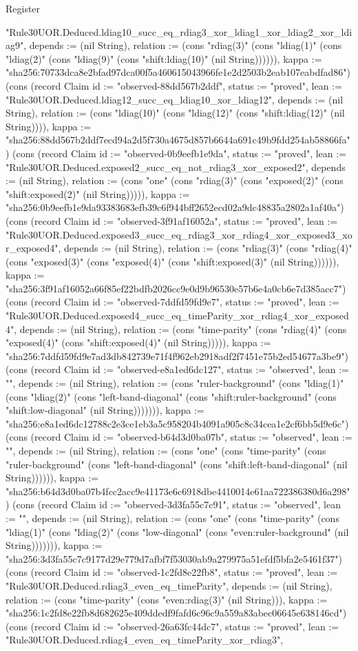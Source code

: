 \begin{lexlean}{Register}
\begin{semanticmodule}
{"Rule30UOR.Deduced.ldiag10_succ_eq_rdiag3_xor_ldiag1_xor_ldiag2_xor_ldiag9", depends := (nil String), relation := (cons "rdiag(3)" (cons "ldiag(1)" (cons "ldiag(2)" (cons "ldiag(9)" (cons "shift:ldiag(10)" (nil String)))))), kappa := "sha256:70733dca8e2bfad97dca00f5a460615043966fe1e2d2503b2eab107eabdfad86"}) (cons (record Claim {id := "observed-88dd567b2ddf", status := "proved", lean := "Rule30UOR.Deduced.ldiag12_succ_eq_ldiag10_xor_ldiag12", depends := (nil String), relation := (cons "ldiag(10)" (cons "ldiag(12)" (cons "shift:ldiag(12)" (nil String)))), kappa := "sha256:88dd567b2ddf7ecd94a2d5f730a4675d857b6644a691c49b9fdd254ab58866fa"}) (cons (record Claim {id := "observed-0b9eefb1e9da", status := "proved", lean := "Rule30UOR.Deduced.exposed2_succ_eq_not_rdiag3_xor_exposed2", depends := (nil String), relation := (cons "one" (cons "rdiag(3)" (cons "exposed(2)" (cons "shift:exposed(2)" (nil String))))), kappa := "sha256:0b9eefb1e9da93383683efb39c6f944bff2652ecd02a9dc48835a2802a1af40a"}) (cons (record Claim {id := "observed-3f91af16052a", status := "proved", lean := "Rule30UOR.Deduced.exposed3_succ_eq_rdiag3_xor_rdiag4_xor_exposed3_xor_exposed4", depends := (nil String), relation := (cons "rdiag(3)" (cons "rdiag(4)" (cons "exposed(3)" (cons "exposed(4)" (cons "shift:exposed(3)" (nil String)))))), kappa := "sha256:3f91af16052a66f85ef22bdfb2026cc9e0d9b96530e57b6e4a0cb6e7d385acc7"}) (cons (record Claim {id := "observed-7ddfd59fd9e7", status := "proved", lean := "Rule30UOR.Deduced.exposed4_succ_eq_timeParity_xor_rdiag4_xor_exposed4", depends := (nil String), relation := (cons "time-parity" (cons "rdiag(4)" (cons "exposed(4)" (cons "shift:exposed(4)" (nil String))))), kappa := "sha256:7ddfd59fd9e7ad3db842739e71f4f962eb2918adf2f7451e75b2ed54677a3be9"}) (cons (record Claim {id := "observed-e8a1ed6dc127", status := "observed", lean := "", depends := (nil String), relation := (cons "ruler-background" (cons "ldiag(1)" (cons "ldiag(2)" (cons "left-band-diagonal" (cons "shift:ruler-background" (cons "shift:low-diagonal" (nil String))))))), kappa := "sha256:e8a1ed6dc12788c2e3ce1eb3a5c958204b4091a905c8c34cea1e2cf6bb5d9e6c"}) (cons (record Claim {id := "observed-b64d3d0ba07b", status := "observed", lean := "", depends := (nil String), relation := (cons "one" (cons "time-parity" (cons "ruler-background" (cons "left-band-diagonal" (cons "shift:left-band-diagonal" (nil String)))))), kappa := "sha256:b64d3d0ba07b4fcc2acc9e41173e6c6918dbe4410014e61aa722386380d6a298"}) (cons (record Claim {id := "observed-3d3fa55c7c91", status := "observed", lean := "", depends := (nil String), relation := (cons "one" (cons "time-parity" (cons "ldiag(1)" (cons "ldiag(2)" (cons "low-diagonal" (cons "even:ruler-background" (nil String))))))), kappa := "sha256:3d3fa55c7c9177d29e779d7afbf7f53030ab9a279975a51efdf5bfa2e5461f37"}) (cons (record Claim {id := "observed-1c2fd8e22fb8", status := "proved", lean := "Rule30UOR.Deduced.rdiag3_even_eq_timeParity", depends := (nil String), relation := (cons "time-parity" (cons "even:rdiag(3)" (nil String))), kappa := "sha256:1c2fd8e22fb8d682625e409ddedf9fafd6c96c9a559a83abec06645e638146cd"}) (cons (record Claim {id := "observed-26a63fc44dc7", status := "proved", lean := "Rule30UOR.Deduced.rdiag4_even_eq_timeParity_xor_rdiag3", }
\end{semanticmodule}
\end{lexlean}
